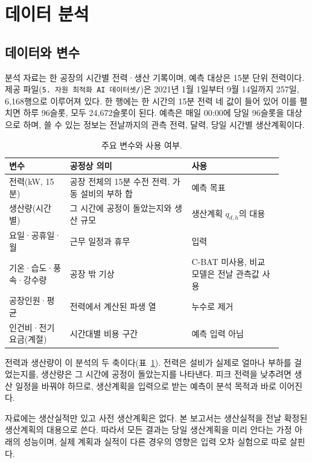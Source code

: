\section{데이터 분석}

\subsection{데이터와 변수}

분석 자료는 한 공장의 시간별 전력·생산 기록이며, 예측 대상은 15분 단위 전력이다. 제공 파일(\texttt{5. 자원 최적화 AI 데이터셋/})은 2021년 1월 1일부터 9월 14일까지 257일, 6,168행으로 이루어져 있다. 한 행에는 한 시간의 15분 전력 네 값이 들어 있어 이를 펼치면 하루 96슬롯, 모두 24,672슬롯이 된다. 예측은 매일 00:00에 당일 96슬롯을 대상으로 하며, 쓸 수 있는 정보는 전날까지의 관측 전력, 달력, 당일 시간별 생산계획이다.

\begin{table}[h]
\centering
\caption{주요 변수와 사용 여부.}
\label{tab:ch3-vars}
\small
\begin{tabular}{p{0.2\linewidth}p{0.4\linewidth}p{0.3\linewidth}}
\toprule
변수 & 공정상 의미 & 사용 \\
\midrule
전력(kW, 15분) & 공장 전체의 15분 수전 전력. 가동 설비의 부하 합 & 예측 목표 \\
생산량(시간별) & 그 시간에 공정이 돌았는지와 생산 규모 & 생산계획 $q_{d,h}$의 대용 \\
요일·공휴일·월 & 근무 일정과 휴무 & 입력 \\
기온·습도·풍속·강수량 & 공장 밖 기상 & C-BAT 미사용, 비교 모델은 전날 관측값 사용 \\
공장인원·평균 & 전력에서 계산된 파생 열 & 누수로 제거 \\
인건비·전기요금(계절) & 시간대별 비용 구간 & 예측 입력 아님 \\
\bottomrule
\end{tabular}
\end{table}

전력과 생산량이 이 분석의 두 축이다(표~\ref{tab:ch3-vars}). 전력은 설비가 실제로 얼마나 부하를 걸었는지를, 생산량은 그 시간에 공정이 돌았는지를 나타낸다. 피크 전력을 낮추려면 생산 일정을 바꿔야 하므로, 생산계획을 입력으로 받는 예측이 분석 목적과 바로 이어진다.

자료에는 생산실적만 있고 사전 생산계획은 없다. 본 보고서는 생산실적을 전날 확정된 생산계획의 대용으로 쓴다. 따라서 모든 결과는 당일 생산계획을 미리 안다는 가정 아래의 성능이며, 실제 계획과 실적이 다른 경우의 영향은 입력 오차 실험으로 따로 살핀다.

